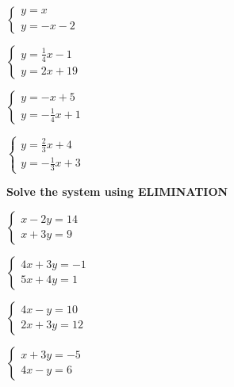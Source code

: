 \documentclass[11pt]{article}
\begin{document}
\begin{multicols}{2}

$\begin{cases}
	y=x\\
	y=-x-2
\end{cases}$

\vspace{.3in}

$\begin{cases}
	y=\frac{1}{4}x-1\\
	y=2x+19
\end{cases}$

\vspace{.3in}

$\begin{cases}
	y=-x+5\\
	y=-\frac{1}{4}x+1
\end{cases}$

\vspace{.3in}

$\begin{cases}
	y=\frac{2}{3}x+4\\
	y=-\frac{1}{3}x+3
\end{cases}$

\vspace{.3in}

\end{multicols}

\hrulefill

\textbf{Solve the system using ELIMINATION}\\

\begin{multicols}{2}

$\begin{cases}
	x-2y=14\\
	x+3y=9
\end{cases}$

\vspace{.3in}

$\begin{cases}
	4x+3y=-1\\
	5x+4y=1
\end{cases}$

\vspace{.3in}

$\begin{cases}
	4x-y=10\\
	2x+3y=12
\end{cases}$

\vspace{.3in}

$\begin{cases}
	x+3y=-5\\
	4x-y=6
\end{cases}$

\vspace{.3in}

\end{multicols}
\end{document}
